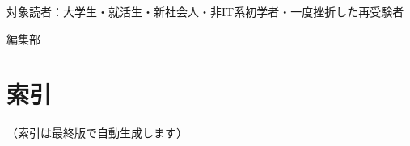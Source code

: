 \documentclass[b5paper,11pt,twoside,openany]{ltjsbook}
\begin{document}
\vspace{1em}
\noindent 対象読者：大学生・就活生・新社会人・非IT系初学者・一度挫折した再受験者

\vspace{2em}
\begin{flushright}
  {\sffamily 編集部}
\end{flushright}

\tableofcontents

\mainmatter








\backmatter

\chapter*{索引}
（索引は最終版で自動生成します）
\end{document}
